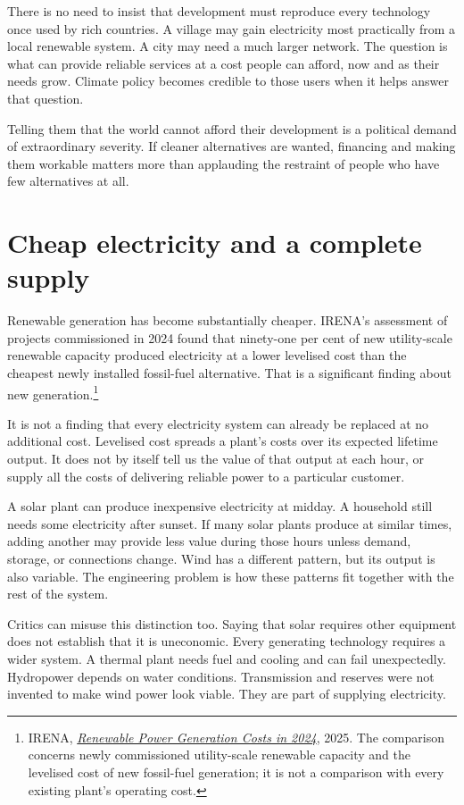\documentclass[12pt,a4paper]{book}
\begin{document}
There is no need to insist that development must reproduce every technology once used by rich countries. A village may gain electricity most practically from a local renewable system. A city may need a much larger network. The question is what can provide reliable services at a cost people can afford, now and as their needs grow. Climate policy becomes credible to those users when it helps answer that question.

Telling them that the world cannot afford their development is a political demand of extraordinary severity. If cleaner alternatives are wanted, financing and making them workable matters more than applauding the restraint of people who have few alternatives at all.

\section*{Cheap electricity and a complete supply}

Renewable generation has become substantially cheaper. IRENA's assessment of projects commissioned in 2024 found that ninety-one per cent of new utility-scale renewable capacity produced electricity at a lower levelised cost than the cheapest newly installed fossil-fuel alternative. That is a significant finding about new generation.\footnote{IRENA, \href{https://www.irena.org/Digital-Report/Renewable-Power-Generation-Costs-in-2024}{\emph{Renewable Power Generation Costs in 2024}}, 2025. The comparison concerns newly commissioned utility-scale renewable capacity and the levelised cost of new fossil-fuel generation; it is not a comparison with every existing plant's operating cost.}

It is not a finding that every electricity system can already be replaced at no additional cost. Levelised cost spreads a plant's costs over its expected lifetime output. It does not by itself tell us the value of that output at each hour, or supply all the costs of delivering reliable power to a particular customer.

A solar plant can produce inexpensive electricity at midday. A household still needs some electricity after sunset. If many solar plants produce at similar times, adding another may provide less value during those hours unless demand, storage, or connections change. Wind has a different pattern, but its output is also variable. The engineering problem is how these patterns fit together with the rest of the system.

Critics can misuse this distinction too. Saying that solar requires other equipment does not establish that it is uneconomic. Every generating technology requires a wider system. A thermal plant needs fuel and cooling and can fail unexpectedly. Hydropower depends on water conditions. Transmission and reserves were not invented to make wind power look viable. They are part of supplying electricity.
\end{document}
